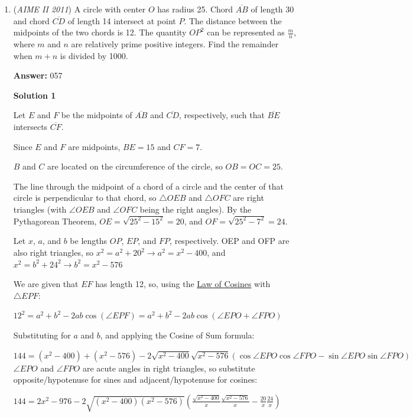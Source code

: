 \begin{enumerate}
	\item (\textit{AIME II 2011}) A circle with center $O$ has radius 25. Chord $\overline{AB}$ of length 30 and chord $\overline{CD}$ of length 14 intersect at point $P$. The distance between the midpoints of the two chords is 12. The quantity $OP^2$ can be represented as $\frac{m}{n}$, where $m$ and $n$ are relatively prime positive integers. Find the remainder when $m + n$ is divided by 1000.


 
 \textbf{Answer: }057



\textbf{Solution 1}

Let $E$ and $F$ be the midpoints of $\overline{AB}$ and $\overline{CD}$, respectively, such that $\overline{BE}$ intersects $\overline{CF}$.

 Since $E$ and $F$ are midpoints, $BE = 15$ and $CF = 7$.

 $B$ and $C$ are located on the circumference of the circle, so $OB = OC = 25$.

 The line through the midpoint of a chord of a circle and the center of that circle is perpendicular to that chord, so $\triangle OEB$ and $\triangle OFC$ are right triangles (with $\angle OEB$ and $\angle OFC$ being the right angles).  By the Pythagorean Theorem, $OE = \sqrt{25^2 - 15^2} = 20$, and $OF = \sqrt{25^2 - 7^2} = 24$.

 Let $x$, $a$, and $b$ be lengths $OP$, $EP$, and $FP$, respectively.  OEP and OFP are also right triangles, so $x^2 = a^2 + 20^2 \to a^2 = x^2 - 400$, and $x^2 = b^2 + 24^2 \to b^2 = x^2 - 576$

 We are given that $EF$ has length 12, so, using the \href{https://artofproblemsolving.com/wiki/index.php?title=Law\_of\_Cosines}{Law of Cosines} with $\triangle EPF$:

 $12^2 = a^2 + b^2 - 2ab \cos (\angle EPF) = a^2 + b^2 - 2ab \cos (\angle EPO + \angle FPO)$

 Substituting for $a$ and $b$, and applying the Cosine of Sum formula:

 $144 = (x^2 - 400) + (x^2 - 576) - 2 \sqrt{x^2 - 400} \sqrt{x^2 - 576} \left( \cos \angle EPO \cos \angle FPO - \sin \angle EPO \sin \angle FPO \right)$
$\angle EPO$ and $\angle FPO$ are acute angles in right triangles, so substitute opposite/hypotenuse for sines and adjacent/hypotenuse for cosines:

 $144 = 2x^2 - 976 - 2 \sqrt{(x^2 - 400)(x^2 - 576)} \left(\frac{\sqrt{x^2 - 400}}{x} \frac{\sqrt{x^2 - 576}}{x} - \frac{20}{x} \frac{24}{x} \right)$


\end{enumerate}
